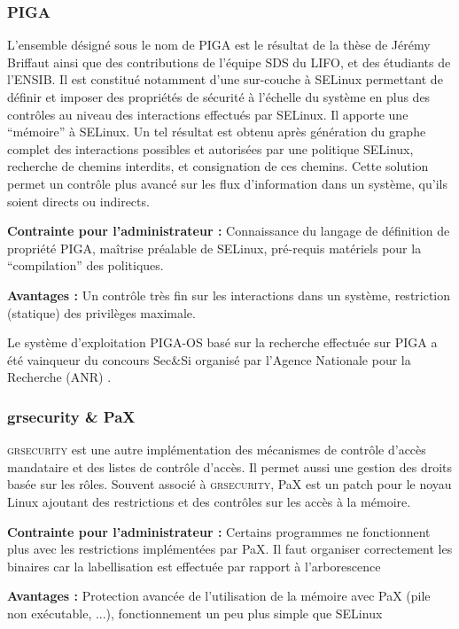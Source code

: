 \subsubsection{PIGA}

L'ensemble désigné sous le nom de PIGA est le résultat de la thèse de Jérémy Briffaut ainsi que des contributions de l'équipe SDS du LIFO, et des étudiants de l'ENSIB. Il est constitué notamment d'une sur-couche à SELinux permettant de définir et imposer des propriétés de sécurité à l'échelle du système en plus des contrôles au niveau des interactions effectués par SELinux. Il apporte une ``mémoire'' à SELinux. Un tel résultat est obtenu après génération du graphe complet des interactions possibles et autorisées par une politique SELinux, recherche de chemins interdits, et consignation de ces chemins. Cette solution permet un contrôle plus avancé sur les flux d'information dans un système, qu'ils soient directs ou indirects.
\begin{list}{}{}
 \item \textbf{Contrainte pour l'administrateur :} Connaissance du langage de définition de propriété PIGA, maîtrise préalable de SELinux, pré-requis matériels pour la ``compilation'' des politiques.
 \item \textbf{Avantages :} Un contrôle très fin sur les interactions dans un système, restriction (statique) des privilèges maximale.
\end{list}

Le système d'exploitation PIGA-OS basé sur la recherche effectuée sur PIGA a été vainqueur du concours Sec\&Si organisé par l'Agence Nationale pour la Recherche (ANR) \cite{PIGA}\cite{PIGA2}.

\subsubsection{grsecurity \& PaX}

\textsc{grsecurity} est une autre implémentation des mécanismes de contrôle d'accès mandataire et des listes de contrôle d'accès. Il permet aussi une gestion des droits basée sur les rôles. Souvent associé à \textsc{grsecurity}, PaX est un patch pour le noyau Linux ajoutant des restrictions et des contrôles sur les accès à la mémoire.
\begin{list}{}{}
 \item \textbf{Contrainte pour l'administrateur :} Certains programmes ne fonctionnent plus avec les restrictions implémentées par PaX. Il faut organiser correctement les binaires car la labellisation est effectuée par rapport à l'arborescence
 \item \textbf{Avantages :} Protection avancée de l'utilisation de la mémoire avec PaX (pile non exécutable, ...), fonctionnement un peu plus simple que SELinux
\end{list}

